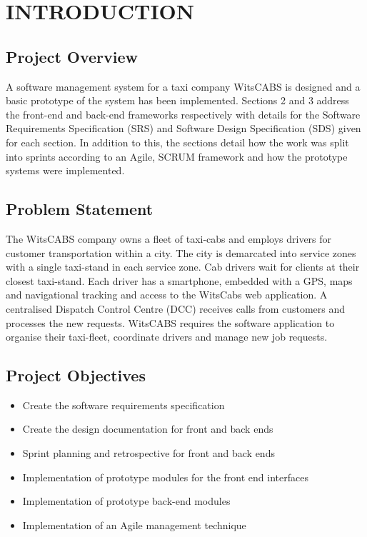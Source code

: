 \documentclass[12pt]{article}
\begin{document}
\section{INTRODUCTION}
\subsection{Project Overview}
A software management system for a taxi company WitsCABS is designed and a basic prototype of the system has been implemented. Sections 2 and 3 address the front-end and back-end frameworks respectively with details for the Software Requirements Specification (SRS) and Software Design Specification (SDS) given for each section. In addition to this, the sections detail how the work was split into sprints according to an Agile, SCRUM framework and how the prototype systems were implemented.
\subsection{Problem Statement}
The WitsCABS company owns a fleet of taxi-cabs and employs drivers for customer transportation within a city. The city is demarcated into service zones with a single taxi-stand in each service zone. Cab drivers wait for clients at their closest taxi-stand. Each driver has a smartphone, embedded with a GPS, maps and navigational tracking and access to the WitsCabs web application. A centralised Dispatch Control Centre (DCC) receives calls from customers and processes the new requests. WitsCABS requires the software application to organise their taxi-fleet, coordinate drivers and manage new job requests.

\subsection{Project Objectives}
\begin{itemize}
\item Create the software requirements specification
\item Create the design documentation for front and back ends
\item Sprint planning  and retrospective for front and back ends
\item Implementation of prototype modules for the front end interfaces
\item Implementation of prototype back-end modules
\item Implementation of an Agile management technique
\end{itemize}
\end{document}
